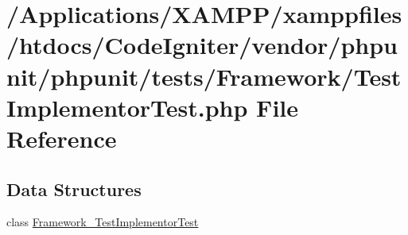 \hypertarget{_test_implementor_test_8php}{}\section{/\+Applications/\+X\+A\+M\+P\+P/xamppfiles/htdocs/\+Code\+Igniter/vendor/phpunit/phpunit/tests/\+Framework/\+Test\+Implementor\+Test.php File Reference}
\label{_test_implementor_test_8php}
\subsection*{Data Structures}
\begin{DoxyCompactItemize}
\item 
class \mbox{\hyperlink{class_framework___test_implementor_test}{Framework\+\_\+\+Test\+Implementor\+Test}}
\end{DoxyCompactItemize}
